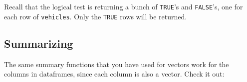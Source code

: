 \documentclass[
]{book}
\newenvironment{Shaded}{\begin{snugshade}}{\end{snugshade}}
\newcommand{\DecValTok}[1]{\textcolor[rgb]{0.00,0.00,0.81}{#1}}
\newcommand{\FloatTok}[1]{\textcolor[rgb]{0.00,0.00,0.81}{#1}}
\newcommand{\FunctionTok}[1]{\textcolor[rgb]{0.13,0.29,0.53}{\textbf{#1}}}
\newcommand{\NormalTok}[1]{#1}
\newcommand{\SpecialCharTok}[1]{\textcolor[rgb]{0.81,0.36,0.00}{\textbf{#1}}}
\newcommand{\StringTok}[1]{\textcolor[rgb]{0.31,0.60,0.02}{#1}}
\begin{document}
Recall that the logical test is returning a bunch of \texttt{TRUE}'s and \texttt{FALSE}'s, one for each row of \texttt{vehicles}. Only the \texttt{TRUE} rows will be returned.

\subsection*{Summarizing}\label{summarizing}

The same summary functions that you have used for vectors work for the columns in dataframes, since each column is also a vector. Check it out:

\begin{Shaded}
\end{Shaded}

\begin{Shaded}
\end{Shaded}

\begin{Shaded}
\end{Shaded}

\begin{Shaded}
\end{Shaded}

\begin{Shaded}
\end{Shaded}
\end{document}
